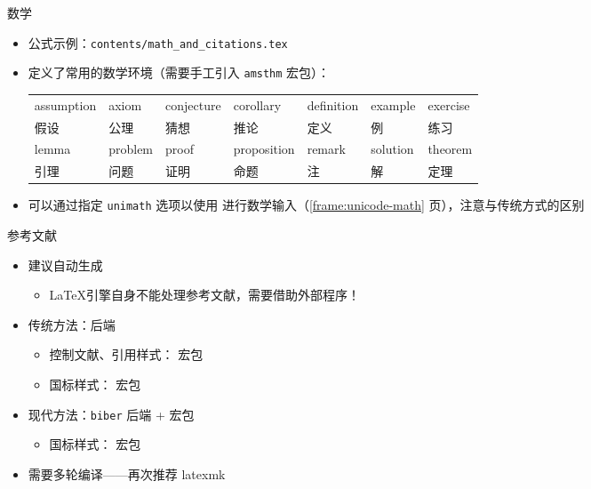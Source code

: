 \begin{frame}[fragile]{数学}
  \begin{itemize}
    \item 公式示例：\nolinkurl{contents/math_and_citations.tex}
    \item \SJTUThesis{} 定义了常用的数学环境（需要手工引入 \verb|amsthm| 宏包）：
          \begin{table}[h]
            \centering
            \footnotesize
            \begin{tabular}{*{7}{l}}\toprule
              assumption & axiom   & conjecture & corollary   & definition & example  & exercise \\
              假设       & 公理    & 猜想       & 推论        & 定义       & 例       & 练习     \\\midrule
              lemma      & problem & proof      & proposition & remark     & solution & theorem  \\
              引理       & 问题    & 证明       & 命题        & 注         & 解       & 定理     \\\bottomrule
            \end{tabular}
          \end{table}
    \item \SJTUThesis{} 可以通过指定 \texttt{unimath} 选项以使用  进行数学输入（\ref{frame:unicode-math} 页），注意与传统方式的区别
  \end{itemize}
\end{frame}

\begin{frame}[fragile]{参考文献}
  \begin{itemize}
    \item 建议自动生成
          \begin{itemize}
            \item \LaTeX 引擎自身不能处理参考文献，需要借助外部程序！
          \end{itemize}
    \item 传统方法：\BibTeX 后端
          \begin{itemize}
            \item 控制文献、引用样式： 宏包
            \item 国标样式： 宏包 
          \end{itemize}
    \item 现代方法：\verb|biber| 后端 +  宏包
          \begin{itemize}
            \item 国标样式： 宏包 
          \end{itemize}
    \item 需要多轮编译——再次推荐 latexmk
  \end{itemize}
\end{frame}

